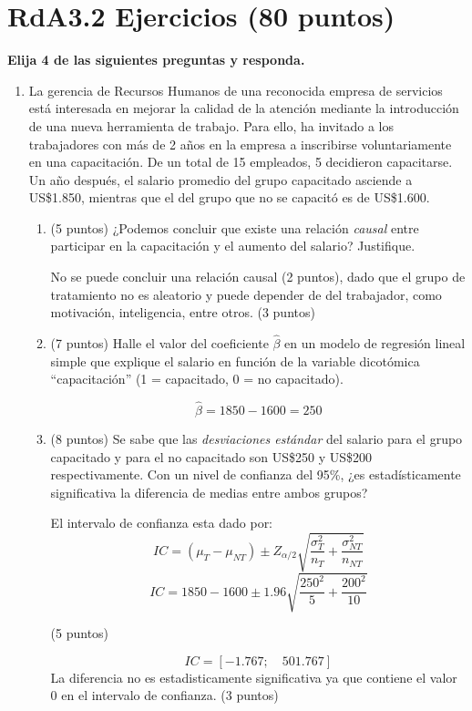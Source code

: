 \documentclass[10pt,a4paper]{article}
\begin{document}
\section{RdA3.2 Ejercicios (80 puntos)}
{\bf Elija 4 de las siguientes preguntas y responda.} 
\begin{enumerate}

  \item La gerencia de Recursos Humanos de una reconocida empresa de servicios está interesada en mejorar la calidad de la atención mediante la introducción de una nueva herramienta de trabajo. Para ello, ha invitado a los trabajadores con más de 2 años en la empresa a inscribirse voluntariamente en una capacitación. De un total de 15 empleados, 5 decidieron capacitarse. Un año después, el salario promedio del grupo capacitado asciende a US\$1.850, mientras que el del grupo que no se capacitó es de US\$1.600.
\begin{enumerate}
      \item  (5 puntos) ¿Podemos concluir que existe una relación \textit{causal} entre participar en la capacitación y el aumento del salario? Justifique.

{\color{blue}  No se puede concluir una relación causal (2 puntos), dado que el grupo de tratamiento no es aleatorio y puede depender de del trabajador, como motivación, inteligencia, entre otros. (3 puntos)}
    \item  (7 puntos) Halle el valor del coeficiente $\hat{\beta}$ en un modelo de regresión lineal simple que explique el salario en función de la variable dicotómica ``capacitación'' (1 = capacitado, 0 = no capacitado).

{\color{blue}    $$\hat{\beta} = 1850-1600 = 250$$}
    \item  (8 puntos) Se sabe que las \textit{desviaciones estándar} del salario para el grupo capacitado y para el no capacitado  son  US\$250  y  US\$200 respectivamente. Con un nivel de confianza del 95\%, ¿es estadísticamente significativa la diferencia de medias entre ambos grupos?

    {\color{blue}  El intervalo de confianza esta dado por:
    $$IC = (\mu_T - \mu_{NT}) \pm Z_{\alpha/2}\sqrt{\frac{\sigma_T^2}{n_T}+\frac{\sigma^2_{NT}}{n_{NT}}}$$
    $$IC = 1850-1600\pm 1.96\sqrt{\frac{250^2}{5}+\frac{200^2}{10}}$$

    (5 puntos)

    $$IC = [ -1.767 ;\quad 501.767]$$
    La diferencia no es estadisticamente significativa ya que contiene el valor 0 en el intervalo de confianza.  (3 puntos)}
\end{enumerate}
    


\end{enumerate}
\end{document}
